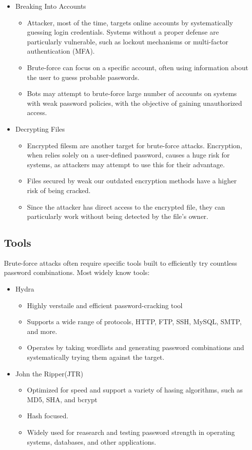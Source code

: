 \documentclass{comjnl}
\begin{document}
\begin{itemize}
  \item Breaking Into Accounts
  \begin{itemize}
    \item Attacker, most of the time, targets online accounts by systematically guessing login credentials. Systems without a proper defense are particularly vulnerable, such as  lockout mechanisms or multi-factor authentication (MFA).
    \item Brute-force can focus on a specific account, often using information about the user to guess probable passwords.
    \item Bots may attempt to brute-force large number of accounts on systems with weak password policies, with the objective of gaining unauthorized access.
  \end{itemize}  
  \item Decrypting Files
  \begin{itemize}
    \item Encrypted filesm are another target for brute-force attacks. Encryption, when relies solely on a user-defined password, causes a huge risk for systems, as attackers may attempt to use this for their advantage.
    \item Files secured by weak our outdated encryption methods have a higher risk of being cracked.
    \item Since the attacker has direct access to the encrypted file, they can particularly work without being detected by the file's owner.
  \end{itemize}
\end{itemize}

\subsection*{Tools}
Brute-force attacks often require specific tools built to efficiently try countless password combinations. Most widely know tools:

\begin{itemize}
  \item Hydra
  \begin{itemize}
    \item Highly verstaile and efficient password-cracking tool
    \item Supports a wide range of protocols, HTTP, FTP, SSH, MySQL, SMTP, and more.
    \item Operates by taking wordlists and generating password combinations and systematically trying them against the target.
  \end{itemize}  
  \item John the Ripper(JTR)
  \begin{itemize}
    \item Optimized for speed and support a variety of hasing algorithms, such as MD5, SHA, and bcrypt
    \item Hash focused.
    \item Widely used for reasearch and testing password strength in operating systems, databases, and other applications.
  \end{itemize}
\end{itemize}
\end{document}

